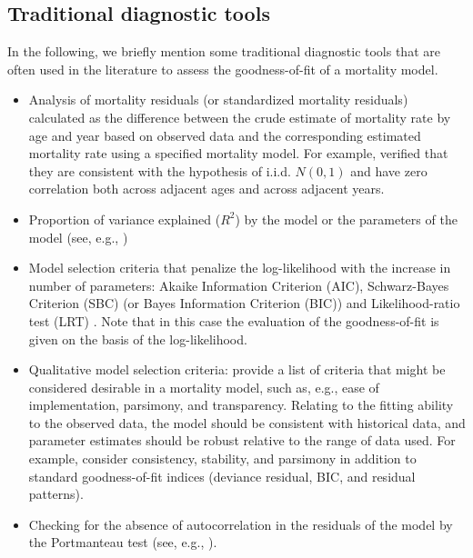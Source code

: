 \documentclass[a4,11pt]{article}
\begin{document}
\subsection{Traditional diagnostic tools}
In the following, we briefly mention some traditional diagnostic tools that are often used in the literature to assess the goodness-of-fit of a mortality model. 
\begin{itemize}
\item Analysis of mortality residuals (or standardized mortality residuals) calculated as the difference between the crude estimate of mortality rate by age and year based on observed data and the corresponding estimated mortality rate using a specified mortality model. For example, \cite{Cairns2010} verified that they are consistent with the hypothesis of i.i.d. $N(0,1)$ and have zero correlation both across adjacent ages and across adjacent years.
\item Proportion of variance explained ($R^2$) by the model or the parameters of the model (see, e.g., \cite{Bongaarts2005})
\item Model selection criteria that penalize the log-likelihood with the increase in number of parameters: Akaike Information Criterion (AIC), Schwarz-Bayes Criterion (SBC) (or Bayes Information Criterion (BIC)) and Likelihood-ratio test (LRT) \cite{Li2009}. Note that in this case the evaluation of the goodness-of-fit is given on the basis of the log-likelihood. 
\item Qualitative model selection criteria: \cite{CBD08} provide a list of criteria that might be considered desirable in a mortality model, such as, e.g., ease of implementation, parsimony, and transparency. Relating to the fitting ability to the observed data, the model should be consistent with historical data, and parameter estimates should be robust relative to the range of data used. For example, \cite{Djeundje2022} consider consistency, stability, and parsimony in addition to standard goodness-of-fit indices (deviance residual, BIC, and residual patterns).
\item Checking for the absence of autocorrelation in the residuals of the model by the Portmanteau test (see, e.g., \cite{Torri2011}).
\end{itemize}
\end{document}
